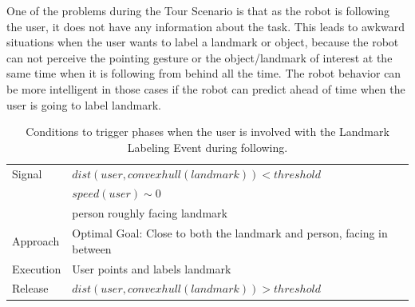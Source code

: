 One of the problems during the Tour Scenario is that as the robot is following the user, it does not have any information about the task. This leads to awkward situations when the user wants to label a landmark or object, because the robot can not perceive the pointing gesture or the object/landmark of interest at the same time when it is following from behind all the time. The robot behavior can be more intelligent in those cases if the robot can predict ahead of time when the user is going to label landmark.

\begin{table}[ht!]
	\centering
  \begin{tabular}{l |  m{10cm}}    
    \toprule    
    Signal & {$dist(user, convex hull(landmark))<threshold$}\\       
	                           & {$speed(user)\sim 0$} \\
	                           & {person roughly facing landmark}\\ \midrule		                           		                                
    Approach & {Optimal Goal: Close to both the landmark and person, facing in between}\\       \midrule
    Execution & {User points and labels landmark}\\  \midrule
    Release & {$dist(user, convex hull(landmark))>threshold$}\\ 
    \bottomrule
  \end{tabular}
      \caption{Conditions to trigger phases when the user is involved with the Landmark Labeling Event during following.}
    \label{table:situation_aware_list_landmark}
\end{table}


